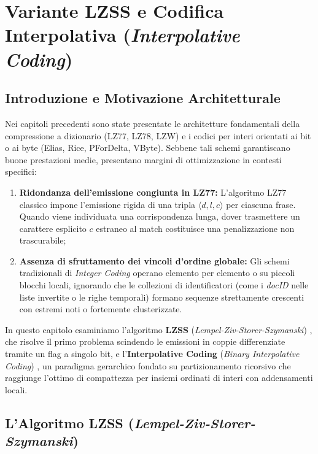\chapter{Variante LZSS e Codifica Interpolativa (\textit{Interpolative Coding})}
\label{ch:lzss-interpolative-coding}

\section{Introduzione e Motivazione Architetturale}
\label{sec:intro-lzss-interpolative}

Nei capitoli precedenti sono state presentate le architetture fondamentali della compressione a dizionario (LZ77, LZ78, LZW) e i codici per interi orientati ai bit o ai byte (Elias, Rice, PForDelta, VByte). Sebbene tali schemi garantiscano buone prestazioni medie, presentano margini di ottimizzazione in contesti specifici:
\begin{enumerate}
  \item \textbf{Ridondanza dell'emissione congiunta in LZ77:} L'algoritmo LZ77 classico \cite{ziv1977} impone l'emissione rigida di una tripla $\langle d, l, c \rangle$ per ciascuna frase. Quando viene individuata una corrispondenza lunga, dover trasmettere un carattere esplicito $c$ estraneo al match costituisce una penalizzazione non trascurabile;
  \item \textbf{Assenza di sfruttamento dei vincoli d'ordine globale:} Gli schemi tradizionali di \textit{Integer Coding} operano elemento per elemento o su piccoli blocchi locali, ignorando che le collezioni di identificatori (come i \textit{docID} nelle liste invertite o le righe temporali) formano sequenze strettamente crescenti con estremi noti o fortemente clusterizzate.
\end{enumerate}

In questo capitolo esaminiamo l'algoritmo \textbf{LZSS} (\textit{Lempel-Ziv-Storer-Szymanski}) \cite{storer1982lzss}, che risolve il primo problema scindendo le emissioni in coppie differenziate tramite un flag a singolo bit, e l'\textbf{Interpolative Coding} (\textit{Binary Interpolative Coding}) \cite{moffat2000interpolative}, un paradigma gerarchico fondato su partizionamento ricorsivo che raggiunge l'ottimo di compattezza per insiemi ordinati di interi con addensamenti locali.

\FloatBarrier
\section{L'Algoritmo LZSS (\textit{Lempel-Ziv-Storer-Szymanski})}
\label{sec:algoritmo-lzss}

